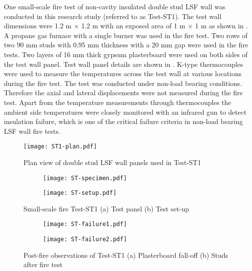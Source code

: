 One small-scale fire test of non-cavity insulated double stud LSF wall was conducted in this research study (referred to as Test-ST1). The test wall dimensions were 1.2 m \(\times\) 1.2 m with an exposed area of 1 m \(\times\) 1 m as shown in . A propane gas furnace with a single burner was used in the fire test. Two rows of two 90 mm studs with 0.95 mm thickness with a 20 mm gap were used in the fire tests. Two layers of 16 mm thick gypsum plasterboard were used on both sides of the test wall panel. Test wall panel details are shown in . K-type thermocouples were used to measure the temperatures across the test wall at various locations during the fire test. The test was conducted under non-load bearing conditions. Therefore the axial and lateral displacements were not measured during the fire test. Apart from the temperature measurements through thermocouples the ambient side temperatures were closely monitored with an infrared gun to detect insulation failure, which is one of the critical failure criteria in non-load bearing LSF wall fire tests. 
\begin{figure}[htbp]
	\centering
		\texttt{[image: ST1-plan.pdf]} 
		\caption{Plan view of double stud LSF wall panels used in Test-ST1}
		\label{fig:ST1-plan}
\end{figure}
\begin{figure}[!htbp]
	\centering
	\begin{subfigure}[b]{0.55\textwidth}
		\centering
		\texttt{[image: ST-specimen.pdf]}
		\caption{}
		\label{subfig:ST-specimen}
	\end{subfigure}
	\begin{subfigure}[b]{0.4\textwidth}
		\centering
		\texttt{[image: ST-setup.pdf]}
		\caption{}
		\label{subfig:ST-setup}
	\end{subfigure}
	   \caption{Small-scale fire Test-ST1 (a) Test panel (b) Test set-up}
	   \label{fig:ST-setup-typical}
\end{figure}
\begin{figure}[!htbp]
	\centering
	\begin{subfigure}[b]{0.4\textwidth}
		\centering
		\texttt{[image: ST-failure1.pdf]}
		\caption{}
		\label{subfig:ST-failure1}
	\end{subfigure}
	\begin{subfigure}[b]{0.55\textwidth}
		\centering
		\texttt{[image: ST-failure2.pdf]}
		\caption{}
		\label{subfig:ST-failure2}
	\end{subfigure}
	   \caption{Post-fire observations of Test-ST1 (a) Plasterboard fall-off (b) Studs after fire test}
	   \label{fig:ST-failure-typical}
\end{figure}

